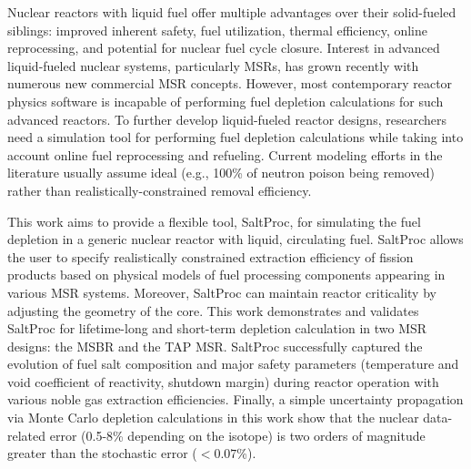 Nuclear reactors with liquid fuel offer multiple advantages over their 
solid-fueled siblings: improved inherent safety, fuel utilization, thermal 
efficiency, online reprocessing, and potential for nuclear fuel cycle closure. 
Interest in advanced liquid-fueled nuclear systems, particularly \glspl{MSR}, 
has grown recently with numerous new commercial \gls{MSR} concepts. 
However, most contemporary reactor physics software is incapable of performing 
fuel depletion calculations for such advanced reactors. To further 
develop liquid-fueled reactor designs, researchers need a simulation tool for 
performing fuel depletion calculations while taking into account online fuel 
reprocessing and refueling. Current modeling efforts in the literature usually 
assume ideal (e.g., 100\% of neutron poison being removed) rather than 
realistically-constrained removal efficiency. 

This work aims to provide a flexible tool, SaltProc, for simulating the fuel 
depletion in a generic nuclear reactor with liquid, circulating fuel. 
SaltProc allows the user to specify realistically constrained extraction 
efficiency of fission products based on physical models of fuel processing 
components appearing in various \gls{MSR} systems. Moreover, SaltProc can 
maintain reactor criticality by adjusting the geometry of the core. This 
work demonstrates and validates SaltProc for lifetime-long and short-term 
depletion calculation in two \gls{MSR} designs: the \gls{MSBR} and the 
\gls{TAP} \gls{MSR}. SaltProc successfully captured the evolution of fuel salt 
composition and major safety parameters (temperature and void coefficient of 
reactivity, shutdown margin) during reactor operation with various noble gas 
extraction efficiencies. Finally, a simple uncertainty propagation via Monte 
Carlo depletion calculations in this work show that the nuclear data-related 
error (0.5-8\% depending on the isotope) is two orders of magnitude greater 
than the stochastic error 
($<0.07$\%).